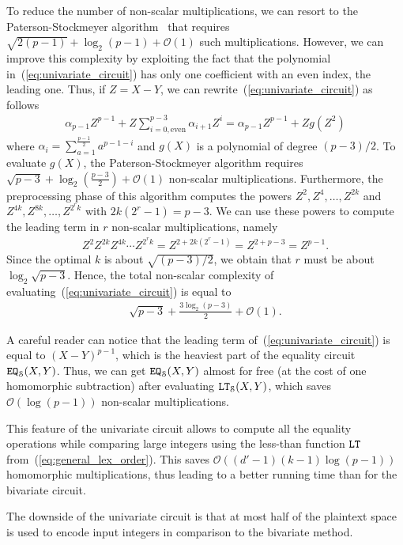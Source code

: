   To reduce the number of non-scalar multiplications, we can resort to the Paterson-Stockmeyer algorithm~\cite{SIAM:PS73} that requires $\sqrt{2(p-1)} + \log_2 (p-1) + \mathcal{O}(1)$ such multiplications.
  However, we can improve this complexity by exploiting the fact that the polynomial in~(\ref{eq:univariate_circuit}) has only one coefficient with an even index, the leading one.
  Thus, if $Z=X-Y$, we can rewrite~(\ref{eq:univariate_circuit}) as follows
  \begin{align*}
    \alpha_{p-1} Z^{p-1} + Z \sum_{i=0, \text{even}}^{p-3} \alpha_{i+1} Z^i =  \alpha_{p-1} Z^{p-1} + Z g(Z^2)
  \end{align*}
  where $\alpha_i = \sum_{a=1}^{\frac{p-1}{2}} a^{p-1-i}$ and $g(X)$ is a polynomial of degree $(p-3)/2$.
  To evaluate $g(X)$, the Paterson-Stockmeyer algorithm requires $\sqrt{p-3} + \log_2 \left(\frac{p-3}{2}\right) + \mathcal{O}(1)$ non-scalar multiplications.
  Furthermore, the preprocessing phase of this algorithm computes the powers $Z^2, Z^4, \dots, Z^{2k}$ and $Z^{4k}, Z^{8k}, \dots, Z^{2^r k}$ with $2k(2^r-1) = p-3$.
  We can use these powers to compute the leading term in $r$ non-scalar multiplications, namely
  \begin{align*}
    Z^2 Z^{2k} Z^{4k} \cdots Z^{2^r k} = Z^{2 + 2k(2^r-1)} = Z^{2 + p - 3} = Z^{p-1}.
  \end{align*}
  Since the optimal $k$ is about $\sqrt{(p-3)/2}$, we obtain that $r$ must be about $\log_2 \sqrt{p-3}$.
  Hence, the total non-scalar complexity of evaluating~(\ref{eq:univariate_circuit}) is equal to
  \begin{align*}
    \sqrt{p-3} + \frac{3 \log_2 \left(p-3\right)}{2} + \mathcal{O}(1).
  \end{align*}
  
  \begin{remark}
    A careful reader can notice that the leading term of~(\ref{eq:univariate_circuit}) is equal to $(X-Y)^{p-1}$, which is the heaviest part of the equality circuit $\mathtt{EQ}_{\mathcal{S}}(X,Y)$.
    Thus, we can get $\mathtt{EQ}_{\mathcal{S}}(X,Y)$ almost for free (at the cost of one homomorphic subtraction) after evaluating $\mathtt{LT}_{\mathcal{S}}(X,Y)$, which saves $\mathcal{O}(\log (p-1))$ non-scalar multiplications.

    This feature of the univariate circuit allows to compute all the equality operations while comparing large integers using the less-than function $\mathtt{LT}$ from~(\ref{eq:general_lex_order}).
    This saves $\mathcal{O}((d'-1)(k-1) \log (p-1))$ homomorphic multiplications, thus leading to a better running time than for the bivariate circuit.

    The downside of the univariate circuit is that at most half of the plaintext space is used to encode input integers in comparison to the bivariate method.
  \end{remark}

